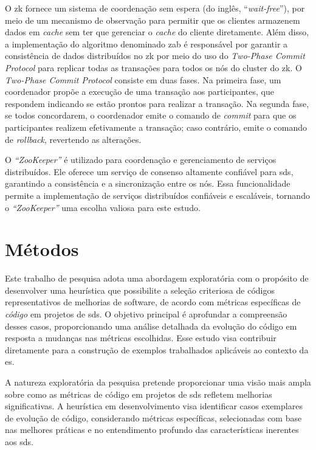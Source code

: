 O \gls{zk} fornece um sistema de coordenação sem espera (do inglês, ``\textit{wait-free}''), por meio de um mecanismo de observação para permitir que os clientes armazenem dados em \textit{cache} sem ter que gerenciar o \textit{cache} do cliente diretamente. Além disso, a implementação do algoritmo denominado \gls{zab} é responsável por garantir a consistência de dados distribuídos no \gls{zk} por meio do uso do \textit{Two-Phase Commit Protocol} para replicar todas as transações para todos os nós do cluster do \gls{zk}\cite{CloudKarafkaZAB}. O \textit{Two-Phase Commit Protocol} consiste em duas fases. Na primeira fase, um coordenador propõe a execução de uma transação aos participantes, que respondem indicando se estão prontos para realizar a transação. Na segunda fase, se todos concordarem, o coordenador emite o comando de \textit{commit} para que os participantes realizem efetivamente a transação; caso contrário, emite o comando de \textit{rollback}, revertendo as alterações. 

O \textit{``ZooKeeper''} é utilizado para coordenação e gerenciamento de serviços distribuídos. Ele oferece um serviço de consenso altamente confiável para \gls{sds}, garantindo a consistência e a sincronização entre os nós. Essa funcionalidade permite a implementação de serviços distribuídos confiáveis e escaláveis, tornando o \textit{``ZooKeeper''} uma escolha valiosa para este estudo.

\section{Métodos}\label{sec:metodo}
Este trabalho de pesquisa adota uma abordagem exploratória com o propósito de desenvolver uma heurística que possibilite a seleção criteriosa de códigos representativos de melhorias de software, de acordo com métricas específicas de \textit{código} em projetos de \gls{sds}. O objetivo principal é aprofundar a compreensão desses casos, proporcionando uma análise detalhada da evolução do código em resposta a mudanças nas métricas escolhidas. Esse estudo visa contribuir diretamente para a construção de exemplos trabalhados aplicáveis ao contexto da \gls{es}.

A natureza exploratória da pesquisa pretende proporcionar uma visão mais ampla sobre como as métricas de código em projetos de \gls{sds} refletem melhorias significativas. A heurística em desenvolvimento visa identificar casos exemplares de evolução de código, considerando métricas específicas, selecionadas com base nas melhores práticas e no entendimento profundo das características inerentes aos \gls{sds}.

